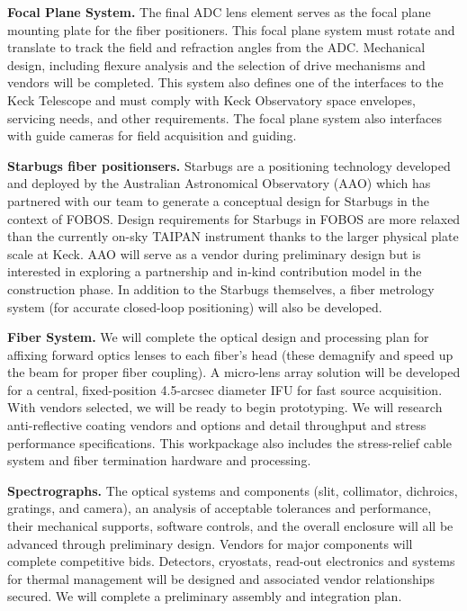 \documentclass[oneside,11pt]{amsart}
\begin{document}
\noindent \textbf{Focal Plane System.} The final ADC lens element serves as the focal plane mounting plate for the fiber positioners.  This focal plane system must rotate and translate to track the field and refraction angles from the ADC.  Mechanical design, including flexure analysis and the selection of drive mechanisms and vendors will be completed.  This system also defines one of the interfaces to the Keck Telescope and must comply with Keck Observatory space envelopes, servicing needs, and other requirements.  The focal plane system also interfaces with guide cameras for field acquisition and guiding.

\noindent \textbf{Starbugs fiber positionsers.} Starbugs are a positioning technology developed and deployed by the
Australian Astronomical Observatory (AAO) which has partnered with our team to generate a conceptual design for
Starbugs in the context of FOBOS.  Design requirements for Starbugs in FOBOS are more relaxed than the currently on-sky
TAIPAN instrument thanks to the larger physical plate scale at Keck.  AAO will serve as a vendor during preliminary
design but is interested in exploring a partnership and in-kind contribution model in the construction phase.  In addition to the Starbugs themselves, a fiber metrology system (for accurate closed-loop positioning) will also be developed.

\noindent \textbf{Fiber System.} We will complete the optical design and processing plan for affixing forward optics
lenses to each fiber's head (these demagnify and speed up the beam for proper fiber coupling).  A micro-lens array
solution will be developed for a central, fixed-position 4.5-arcsec diameter IFU for fast source acquisition.  With vendors selected, we will be ready to begin prototyping.  We will
research anti-reflective coating vendors and options and detail throughput and stress performance specifications.  This
workpackage also includes the stress-relief cable system and fiber termination hardware and processing.

\noindent \textbf{Spectrographs.} The optical systems and components (slit, collimator, dichroics, gratings, and camera), an analysis of acceptable tolerances and performance, their mechanical supports, software controls, and the overall enclosure will all be advanced through preliminary design.  Vendors for major components will complete competitive bids.  Detectors, cryostats, read-out electronics and systems for thermal management will be designed and associated vendor relationships secured. We will complete a preliminary assembly and integration plan.
\end{document}
